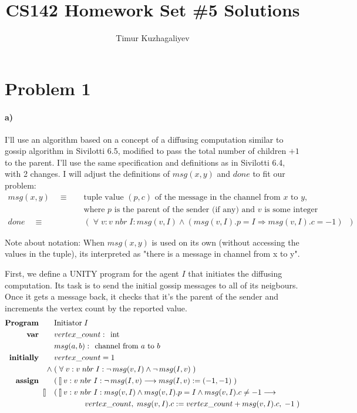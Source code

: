 \documentclass[10pt,letter]{article}
\def\fatbar{\talloblong}
\begin{document}
\title{CS142 Homework Set \#5 Solutions}

\author{Timur Kuzhagaliyev}

 
\maketitle 

\section*{Problem 1}

\paragraph{a)} I'll use an algorithm based on a concept of a diffusing computation similar to gossip algorithm in Sivilotti 6.5, modified to pass the total number of children $+ 1$ to the parent. I'll use the same specification and definitions as in Sivilotti 6.4, with 2 changes. I will adjust the definitions of $msg(x, y)$ and $done$ to fit our problem:
\begin{align*}
msg(x, y)\quad \equiv \quad &\textrm{tuple value $(p, c)$ of the message in the channel from $x$ to $y$,}
\\
& \textrm{where $p$ is the parent of the sender (if any) and $v$ is some integer}
\\
done\quad \equiv \quad &(\; \forall\; v : v\; nbr\; I : msg(v, I) \land (msg(v, I).p = I \Rightarrow  msg(v, I).c = -1)\;\; )
\end{align*}

Note about notation: When $msg(x, y)$ is used on its own (without accessing the values in the tuple), its interpreted as "there is a message in channel from x to y".

First, we define a UNITY program for the agent $I$ that initiates the diffusing computation. Its task is to send the initial gossip messages to all of its neigbours. Once it gets a message back, it checks that it's the parent of the sender and increments the vertex count by the reported value.
\begin{align*}
\textrm{\textbf{Program}} \qquad & \textrm{Initiator}\; I
\\
\textrm{\textbf{var}} \qquad & vertex\_count\; \textrm{:\; int}
\\ & msg(a, b)\; \textrm{:\; channel from $a$ to $b$}
\\
\textrm{\textbf{initially}} \qquad & vertex\_count = 1
\\
\land\; & (\; \forall\; v : v\; nbr\; I : \neg\, msg(v, I) \land \neg\, msg(I, v)\; )
\\
\textrm{\textbf{assign}} \qquad &
(\, \fatbar\, v : v\; nbr\; I : \neg\, msg(I, v) \longrightarrow msg(I, v) := (-1, -1)\; )
\\
\fatbar\quad & (\, \fatbar\, v : v\; nbr\; I : msg(v, I) \land msg(v, I).p = I \land msg(v, I).c \neq -1 \longrightarrow 
\\
& \qquad \qquad vertex\_count,\; msg(v, I).c := vertex\_count + msg(v, I).c,\; -1\; )
\end{align*}
\end{document}
